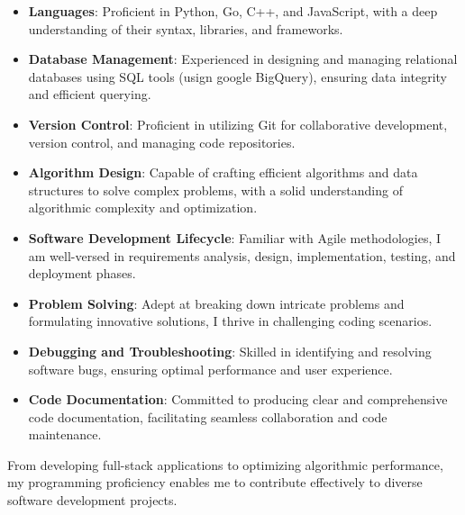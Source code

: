 \documentclass[10pt,a4paper,ragged2e,withhyper,academicons]{altacv}
\begin{document}
\begin{paracol}{1}
\hspace*{-1em}  %
\begin{itemize}
    \item \textbf{Languages}: Proficient in Python, Go, C++, and JavaScript, with a deep understanding of their syntax, libraries, and frameworks. 
    \item \textbf{Database Management}: Experienced in designing and managing relational databases using SQL tools (usign google BigQuery), ensuring data integrity and efficient querying.
    \item \textbf{Version Control}: Proficient in utilizing Git for collaborative development, version control, and managing code repositories.
    \item \textbf{Algorithm Design}: Capable of crafting efficient algorithms and data structures to solve complex problems, with a solid understanding of algorithmic complexity and optimization.
    \item \textbf{Software Development Lifecycle}: Familiar with Agile methodologies, I am well-versed in requirements analysis, design, implementation, testing, and deployment phases.
    \item \textbf{Problem Solving}: Adept at breaking down intricate problems and formulating innovative solutions, I thrive in challenging coding scenarios.
    \item \textbf{Debugging and Troubleshooting}: Skilled in identifying and resolving software bugs, ensuring optimal performance and user experience.
    \item \textbf{Code Documentation}: Committed to producing clear and comprehensive code documentation, facilitating seamless collaboration and code maintenance.
\end{itemize}
From developing full-stack applications to optimizing algorithmic performance, my programming proficiency enables me to contribute effectively to diverse software development projects.    


\end{paracol}
\end{document}
